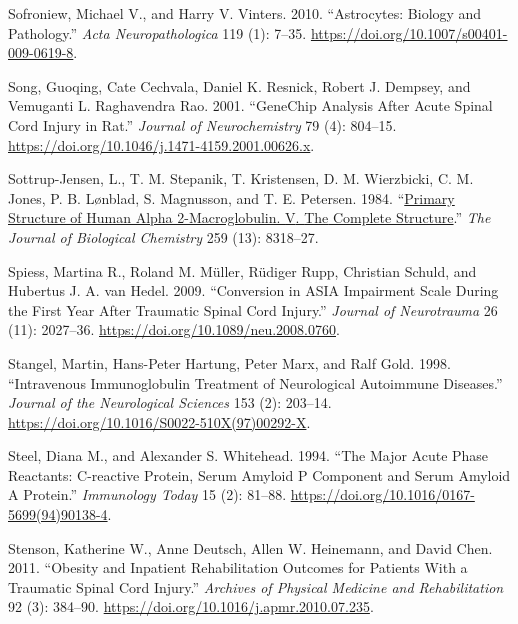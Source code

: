 \documentclass[9pt,lineno]{elife}
\newlength{\cslhangindent}
\newlength{\cslentryspacingunit} %
\newenvironment{CSLReferences}[2] %
 {%
  \setlength{\parindent}{0pt}
  \ifodd #1
  \let\oldpar\par
  \def\par{\hangindent=\cslhangindent\oldpar}
  \fi
  \setlength{\parskip}{#2\cslentryspacingunit}
 }%
 {}
\begin{document}
\begin{CSLReferences}{1}{0}
\leavevmode{}%
Sofroniew, Michael V., and Harry V. Vinters. 2010. {``Astrocytes: Biology and Pathology.''} \emph{Acta Neuropathologica} 119 (1): 7--35. \url{https://doi.org/10.1007/s00401-009-0619-8}.

\leavevmode{}%
Song, Guoqing, Cate Cechvala, Daniel K. Resnick, Robert J. Dempsey, and Vemuganti L. Raghavendra Rao. 2001. {``{GeneChip} Analysis After Acute Spinal Cord Injury in Rat.''} \emph{Journal of Neurochemistry} 79 (4): 804--15. \url{https://doi.org/10.1046/j.1471-4159.2001.00626.x}.

\leavevmode{}%
Sottrup-Jensen, L., T. M. Stepanik, T. Kristensen, D. M. Wierzbicki, C. M. Jones, P. B. Lønblad, S. Magnusson, and T. E. Petersen. 1984. {``\href{https://www.ncbi.nlm.nih.gov/pubmed/6203908}{Primary Structure of Human Alpha 2-Macroglobulin. {V}. {The} Complete Structure}.''} \emph{The Journal of Biological Chemistry} 259 (13): 8318--27.

\leavevmode{}%
Spiess, Martina R., Roland M. Müller, Rüdiger Rupp, Christian Schuld, and Hubertus J. A. van Hedel. 2009. {``Conversion in {ASIA Impairment Scale} During the First Year After Traumatic Spinal Cord Injury.''} \emph{Journal of Neurotrauma} 26 (11): 2027--36. \url{https://doi.org/10.1089/neu.2008.0760}.

\leavevmode{}%
Stangel, Martin, Hans-Peter Hartung, Peter Marx, and Ralf Gold. 1998. {``Intravenous Immunoglobulin Treatment of Neurological Autoimmune Diseases.''} \emph{Journal of the Neurological Sciences} 153 (2): 203--14. \url{https://doi.org/10.1016/S0022-510X(97)00292-X}.

\leavevmode{}%
Steel, Diana M., and Alexander S. Whitehead. 1994. {``The Major Acute Phase Reactants: {C-reactive} Protein, Serum Amyloid {P} Component and Serum Amyloid {A} Protein.''} \emph{Immunology Today} 15 (2): 81--88. \url{https://doi.org/10.1016/0167-5699(94)90138-4}.

\leavevmode{}%
Stenson, Katherine W., Anne Deutsch, Allen W. Heinemann, and David Chen. 2011. {``Obesity and {Inpatient Rehabilitation Outcomes} for {Patients With} a {Traumatic Spinal Cord Injury}.''} \emph{Archives of Physical Medicine and Rehabilitation} 92 (3): 384--90. \url{https://doi.org/10.1016/j.apmr.2010.07.235}.


\end{CSLReferences}
\end{document}
